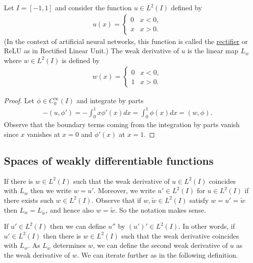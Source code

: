 \documentclass[12pt,oneside]{amsart}
\begin{document}
\begin{example}\label{ex_relu}
Let $I = [-1,1]$ and consider the function $u \in L^2(I)$ defined by
    \begin{align*}
u(x) = \begin{cases}
0 & x < 0,
\\
x & x > 0.
\end{cases}
    \end{align*}
(In the context of artificial neural networks, this function is called the \href{https://en.wikipedia.org/wiki/Rectifier_(neural_networks)}{rectifier} or ReLU as in Rectified Linear Unit.)
The weak derivative of $u$ is the linear map $L_w$ where
$w \in L^2(I)$ is defined by 
    \begin{align*}
w(x) = \begin{cases}
0 & x < 0,
\\
1 & x > 0.
\end{cases}
    \end{align*}
\end{example}
\begin{proof}
Let $\phi \in C_0^\infty(I)$ and integrate by parts
    \begin{align*}
-(u, \phi') = -\int_0^1 x \phi'(x) dx = \int_0^1 \phi(x) dx
= (w, \phi).
    \end{align*}
Observe that the boundary terms coming from the integration by parts vanish since $x$ vanishes at $x = 0$ and $\phi'(x)$ at $x = 1$. 
\end{proof}

\subsection{Spaces of weakly differentiable functions}

If there is $w \in L^2(I)$ such that the weak derivative of $u \in L^2(I)$ coincides with $L_w$ then we write $w = u'$.
Moreover, we write $u' \in L^2(I)$ for $u \in L^2(I)$ if there exists such $w \in L^2(I)$.
Observe that if $w, \tilde w \in L^2(I)$ satisfy $w = u' = \tilde w$ then $L_w = L_{\tilde w}$, and hence also $w = \tilde w$. 
So the notation makes sense. 

If $u' \in L^2(I)$ then we can define $u''$ by $(u')' \in L^2(I)$. 
In other words, if $u' \in L^2(I)$ then there is $w \in L^2(I)$
such that the weak derivative coincides with $L_w$. As $L_w$ determines $w$, we can define the second weak derivative of $u$ as the weak derivative of $w$.
We can iterate further as in the following definition.
\end{document}
